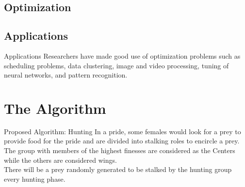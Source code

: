 \documentclass[xcolor=table]{beamer}
\begin{document}
\subsection{Optimization}

\subsection{Applications}
\begin{frame}{Applications}
Researchers have made good use of optimization problems such as scheduling problems, data clustering, image and video processing, tuning of neural networks, and pattern recognition.
\end{frame}

\section{The Algorithm}


\begin{frame}{Proposed Algorithm: Hunting}
In a pride, some females would look for a prey to provide food for the pride and are divided into stalking roles to encircle a prey.\\The group with members of the highest finesses are considered as the Centers while the others are considered wings.\\There will be a prey randomly generated to be stalked by the hunting group every hunting phase.
\end{frame}
\end{document}
